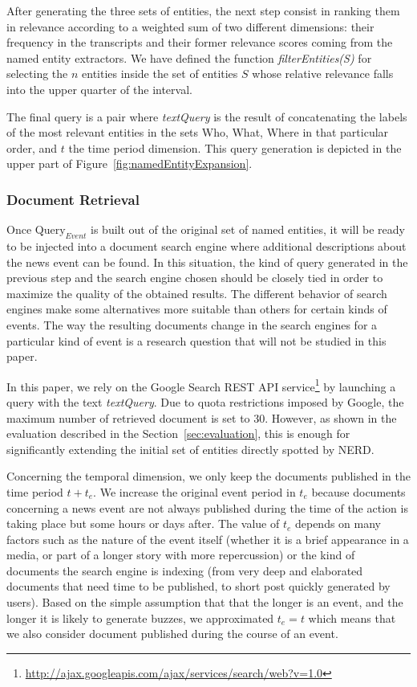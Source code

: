 \documentclass{llncs}
\begin{document}
After generating the three sets of entities, the next step consist in ranking them in relevance according to a weighted sum of two different dimensions: their frequency in the transcripts and their former relevance scores coming from the named entity extractors. We have defined the function \emph{filterEntities(S)} for selecting the $n$ entities inside the set of entities $S$ whose relative relevance falls into the upper quarter of the interval.

The final query is a pair where \textit{textQuery} is the result of concatenating the labels of the most relevant entities in the sets Who, What, Where in that particular order, and $t$ the time period dimension. This query generation is depicted in the upper part of Figure~\ref{fig:namedEntityExpansion}.

\subsubsection{Document Retrieval}
Once $\text{Query}_{Event}$ is built out of the original set of named entities, it will be ready to be injected into a document search engine where additional descriptions about the news event can be found. In this situation, the kind of query generated in the previous step and the search engine chosen should be closely tied in order to maximize the quality of the obtained results. The different behavior of search engines make some alternatives more suitable than others for certain kinds of events. The way the resulting documents change in the search engines for a particular kind of event is a research question that will not be studied in this paper.

In this paper, we rely on the Google Search REST API service\footnote{\fontsize{8pt}{1em}\selectfont  \url{http://ajax.googleapis.com/ajax/services/search/web?v=1.0}} by launching a query with the text \textit{textQuery}. Due to quota restrictions imposed by Google, the maximum number of retrieved document is set to 30. However, as shown in the evaluation described in the Section~\ref{sec:evaluation}, this is enough for significantly extending the initial set of entities directly spotted by NERD.

Concerning the temporal dimension, we only keep the documents published in the time period $t+t_{e}$. We increase the original event period in $t_{e}$ because documents concerning a news event are not always published during the time of the action is taking place but some hours or days after. The value of $t_{e}$ depends on many factors such as the nature of the event itself (whether it is a brief appearance in a media, or part of a longer story with more repercussion) or the kind of documents the search engine is indexing (from very deep and elaborated documents that need time to be published, to short post quickly generated by users). Based on the simple assumption that that the longer is an event, and the longer it is likely to generate buzzes, we approximated  $t_{e} = t$ which means that we also consider document published during the course of an event.
\end{document}
